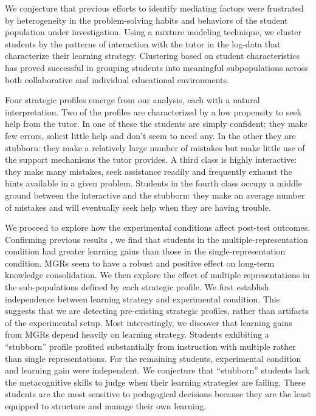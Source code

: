 \documentclass{edm_template}
\begin{document}
We conjecture that previous efforts to identify mediating factors were frustrated by heterogeneity in the problem-solving habits and behaviors of the student population under investigation. Using a mixture modeling technique, we cluster students by the patterns of interaction with the tutor in the log-data that characterize their learning strategy. Clustering based on student characteristics has proved successful in grouping students into meaningful subpopulations across both collaborative \cite{Perera2009} and individual \cite{Merceron2005} educational environments. 

Four strategic profiles emerge from our analysis, each with a natural interpretation. Two of the profiles are characterized by a low propensity to seek help from the tutor. In one of these the students are simply confident: they make few errors, solicit little help and don't seem to need any. In the other they are stubborn: they make a relatively large number of mistakes but make little use of the support mechanisms the tutor provides. A third class is highly interactive: they make many mistakes, seek assistance readily and frequently exhaust the hints available in a given problem. Students in the fourth class occupy a middle ground between the interactive and the stubborn: they make an average number of mistakes and will eventually seek help when they are having trouble.

We proceed to explore how the experimental conditions affect post-test outcomes. Confirming previous results \cite{Rau2012}, we find that students in the multiple-representation condition had greater learning gains than those in the single-representation condition. MGRs seem to have a robust and positive effect on long-term knowledge consolidation. We then explore the effect of multiple representations in the sub-populations defined by each strategic profile. We first establish independence between learning strategy and experimental condition. This suggests that we are detecting pre-existing strategic profiles, rather than artifacts of the experimental setup. Most interestingly, we discover that learning gains from MGRs depend heavily on learning strategy. Students exhibiting a ``stubborn'' profile profited substantially from instruction with multiple rather than single representations. For the remaining students, experimental condition and learning gain were independent. We conjecture that ``stubborn'' students lack the metacognitive skills to judge when their learning strategies are failing. These students are the most sensitive to pedagogical decisions because they are the least equipped to structure and manage their own learning. 
\end{document}
